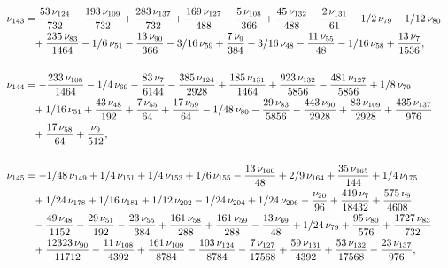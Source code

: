 \documentclass[a4paper,12pt, DIV=14, BCOR=5mm, twoside, headsepline, numbers=noenddot]{scrbook}
\begin{document}
\begin{align}\label{AreaSol13}
\begin{aligned}
\\
\nu_{{143}}&={\frac {53\,\nu_{{124}}}{732}}-{\frac {193\,\nu_{{
109}}}{732}}+{\frac {283\,\nu_{{137}}}{732}}+{\frac {169\,\nu_{{127}}
}{488}}-{\frac {5\,\nu_{{108}}}{366}}+{\frac {45\,\nu_{{132}}}{488}}-{
\frac {2\,\nu_{{131}}}{61}}-1/2\,\nu_{{79}}-1/12\,\nu_{{80}}\\
 &\hphantom{=}+{\frac {
235\,\nu_{{83}}}{1464}}-1/6\,\nu_{{51}}-{\frac {13\,\nu_{{90}}}{366}}-
3/16\,\nu_{{59}}+{\frac {7\,\nu_{{9}}}{384}}-3/16\,\nu_{{48}}-{\frac {
11\,\nu_{{55}}}{48}}-1/16\,\nu_{{58}}+{\frac {13\,\nu_{{7}}}{1536}},\\
\\
\nu_{{144}}&=-{\frac {233\,\nu_{{108}}}{1464}}-1/4\,\nu_{{69}}-{\frac {
83\,\nu_{{7}}}{6144}}-{\frac {385\,\nu_{{124}}}{2928}}+{\frac {185\,
\nu_{{131}}}{1464}}+{\frac {923\,\nu_{{132}}}{5856}}-{\frac {481\,\nu_
{{127}}}{5856}}+1/8\,\nu_{{79}}\\
 &\hphantom{=}+1/16\,\nu_{{51}}+{\frac {43\,\nu_{{48}
}}{192}}+{\frac {7\,\nu_{{55}}}{64}}+{\frac {17\,\nu_{{59}}}{64}}-1/48
\,\nu_{{80}}-{\frac {29\,\nu_{{83}}}{5856}}-{\frac {443\,\nu_{{90}}}{
2928}}+{\frac {83\,\nu_{{109}}}{2928}}+{\frac {435\,\nu_{{137}}}{976}}
\\
 &\hphantom{=}+{\frac {17\,\nu_{{58}}}{64}}+{\frac {\nu_{{9}}}{512}}, \\
\\
\nu_{{145}}&=-1/
48\,\nu_{{149}}+1/4\,\nu_{{151}}+1/4\,\nu_{{153}}+1/6\,\nu_{{155}}-{
\frac {13\,\nu_{{160}}}{48}}+2/9\,\nu_{{164}}+{\frac {35\,\nu_{{165}}
}{144}}+1/4\,\nu_{{175}}\\
 &\hphantom{=}+1/24\,\nu_{{178}}+1/16\,\nu_{{181}}+1/12\,\nu
_{{202}}-1/24\,\nu_{{204}}+1/24\,\nu_{{206}}-{\frac {\nu_{{20}}}{96}}+
{\frac {419\,\nu_{{7}}}{18432}}+{\frac {575\,\nu_{{9}}}{4608}}\\
 &\hphantom{=}-{\frac 
{49\,\nu_{{48}}}{1152}}-{\frac {29\,\nu_{{51}}}{192}}-{\frac {23\,\nu_
{{55}}}{384}}+{\frac {161\,\nu_{{58}}}{288}}+{\frac {161\,\nu_{{59}}}{
288}}-{\frac {13\,\nu_{{69}}}{48}}+1/24\,\nu_{{79}}+{\frac {95\,\nu_{{
80}}}{576}}+{\frac {1727\,\nu_{{83}}}{732}}\\
 &\hphantom{=}+{\frac {12323\,\nu_{{90}}
}{11712}}-{\frac {11\,\nu_{{108}}}{4392}}+{\frac {161\,\nu_{{109}}}{
8784}}-{\frac {103\,\nu_{{124}}}{8784}}-{\frac {7\,\nu_{{127}}}{17568}
}+{\frac {59\,\nu_{{131}}}{4392}}+{\frac {53\,\nu_{{132}}}{17568}}-{
\frac {23\,\nu_{{137}}}{976}}, \\

\end{aligned}
\end{align}
\end{document}
